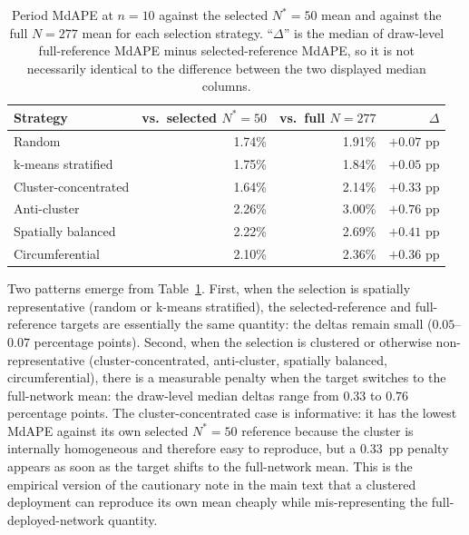 \begin{table}[ht]
\centering
\small
\caption{Period MdAPE at $n=10$ against the selected $N^*=50$ mean and against the full  $N=277$ mean for each  selection strategy. ``$\Delta$'' is the median of draw-level full-reference MdAPE minus selected-reference MdAPE, so it is not necessarily identical to the difference between the two displayed median columns.}
\label{tab:si_dual_reference}
\begin{tabular}{lrrr}
\toprule
\textbf{Strategy} & vs.\ selected $N^*=50$ & vs.\ full $N=277$ & $\Delta$ \\
\midrule
Random & 1.74\% & 1.91\% & $+0.07$ pp \\
k-means stratified & 1.75\% & 1.84\% & $+0.05$ pp \\
Cluster-concentrated & 1.64\% & 2.14\% & $+0.33$ pp \\
Anti-cluster & 2.26\% & 3.00\% & $+0.76$ pp \\
Spatially balanced & 2.22\% & 2.69\% & $+0.41$ pp \\
Circumferential & 2.10\% & 2.36\% & $+0.36$ pp \\
\bottomrule
\end{tabular}
\end{table}

Two patterns emerge from Table~\ref{tab:si_dual_reference}. First, when the selection is spatially representative (random or k-means stratified), the selected-reference and full-reference targets are essentially the same quantity: the deltas remain small ($0.05$--$0.07$ percentage points). Second, when the selection is clustered or otherwise non-representative (cluster-concentrated, anti-cluster, spatially balanced, circumferential), there is a measurable penalty when the target switches to the full-network mean: the draw-level median deltas range from $0.33$ to $0.76$ percentage points. The cluster-concentrated case is informative: it has the lowest MdAPE against its own selected $N^*=50$ reference because the cluster is internally homogeneous and therefore easy to reproduce, but a $0.33$~pp penalty appears as soon as the target shifts to the full-network mean. This is the empirical version of the cautionary note in the main text that a clustered deployment can reproduce its own mean cheaply while mis-representing the full-deployed-network quantity.

\clearpage

